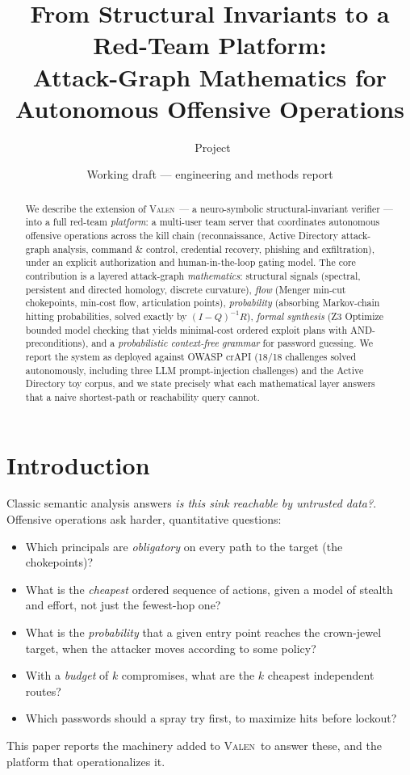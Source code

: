\documentclass[11pt]{article}
\title{\bfseries From Structural Invariants to a Red-Team Platform:\\ \Large
Attack-Graph Mathematics for Autonomous Offensive Operations}
\author{\valen\ Project}
\date{Working draft --- engineering and methods report}
\newcommand{\valen}{\textsc{Valen}}
\begin{document}
\maketitle

\begin{abstract}
\noindent We describe the extension of \valen\ --- a neuro-symbolic
structural-invariant verifier --- into a full red-team \emph{platform}: a
multi-user team server that coordinates autonomous offensive operations across
the kill chain (reconnaissance, Active Directory attack-graph analysis, command
\& control, credential recovery, phishing and exfiltration), under an explicit
authorization and human-in-the-loop gating model. The core contribution is a
layered attack-graph \emph{mathematics}: structural signals (spectral, persistent
and directed homology, discrete curvature), \emph{flow} (Menger min-cut
chokepoints, min-cost flow, articulation points), \emph{probability} (absorbing
Markov-chain hitting probabilities, solved exactly by $(I-Q)^{-1}R$),
\emph{formal synthesis} (Z3 Optimize bounded model checking that yields minimal-cost
ordered exploit plans with AND-preconditions), and a \emph{probabilistic
context-free grammar} for password guessing. We report the system as deployed
against OWASP crAPI (18/18 challenges solved autonomously, including three LLM
prompt-injection challenges) and the Active Directory toy corpus, and we state
precisely what each mathematical layer answers that a naive shortest-path or
reachability query cannot.
\end{abstract}

\section{Introduction}
Classic semantic analysis answers \emph{is this sink reachable by untrusted
data?}. Offensive operations ask harder, quantitative questions:
\begin{itemize}[itemsep=1pt]
  \item Which principals are \emph{obligatory} on every path to the target (the
        chokepoints)?
  \item What is the \emph{cheapest} ordered sequence of actions, given a model of
        stealth and effort, not just the fewest-hop one?
  \item What is the \emph{probability} that a given entry point reaches the
        crown-jewel target, when the attacker moves according to some policy?
  \item With a \emph{budget} of $k$ compromises, what are the $k$ cheapest
        independent routes?
  \item Which passwords should a spray try first, to maximize hits before lockout?
\end{itemize}
This paper reports the machinery added to \valen\ to answer these, and the
platform that operationalizes it.
\end{document}
